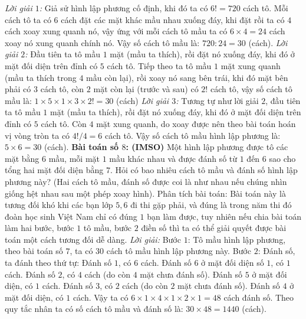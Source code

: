 \begin{multicols}{2}
	\vskip 0.1cm
	\textit{Lời giải $1$:}
	\vskip 0.1cm 
	Giả sử hình lập phương cố định, khi đó ta có $6!=720$ cách tô.
	\vskip 0.1cm
	Mỗi cách tô ta có $6$ cách đặt các mặt khác mầu nhau xuống đáy, khi đặt rồi ta có $4$ cách xoay xung quanh nó, vậy ứng với mỗi cách tô mầu ta có $6\times4=24$ cách xoay nó xung quanh chính nó. Vậy số cách tô mầu là: $720:24=30$ (cách).
	\vskip 0.1cm
	\textit{Lời giải $2$:}
	\vskip 0.1cm 
	Đầu tiên ta tô mầu $1$ mặt (mầu ta thích), rồi đặt nó xuống đáy, khi đó ở mặt đối diện trên đỉnh có $5$ cách tô.
	\vskip 0.1cm
	Tiếp theo ta tô mầu $1$ mặt xung quanh (mầu ta thích trong $4$ mầu còn lại), rồi xoay nó sang bên trái, khi đó mặt bên phải có $3$ cách tô, còn $2$ mặt còn lại (trước và sau) có $2!$ cách tô, vậy số cách tô mầu là: $1\times5\times1\times3\times2!=30$ (cách)
	\vskip 0.1cm
	\textit{Lời giải $3$:}
	\vskip 0.1cm
	Tương tự như lời giải $2$, đầu tiên ta tô mầu $1$ mặt (mầu ta thích), rồi đặt nó xuống đáy, khi đó ở mặt đối diện trên đỉnh có $5$ cách tô.
	\vskip 0.1cm
	Còn $4$ mặt xung quanh, do xoay được nên theo bài toán hoán vị vòng tròn ta có $4!/4=6$ cách tô.
	\vskip 0.1cm
	Vậy số cách tô mầu hình lập phương là: $5\times 6=30$ (cách).
	\vskip 0.1cm
	\textbf{\color{toancuabi}Bài toán số $8$: (IMSO)}
	\vskip 0.1cm
	Một hình lập phương được tô các mặt bằng $6$ mầu, mỗi mặt $1$ mầu khác nhau và được đánh số từ $1$ đến $6$ sao cho tổng hai mặt đối diện bằng $7$. Hỏi có bao nhiêu cách tô mầu và đánh số hình lập phương này? (Hai cách tô mầu, đánh số được coi là như nhau nếu chúng nhìn giống hệt nhau sau một phép xoay hình). 
	\vskip 0.1cm
	Phân tích bài toán: Bài toán này là tương đối khó khi các bạn lớp $5,6$ đi thi gặp phải, và đúng là trong năm thi đó đoàn học sinh Việt Nam chỉ có đúng $1$ bạn làm được, tuy nhiên nếu chia bài toán làm hai bước, bước $1$ tô mầu, bước $2$ điền số thì ta có thể giải quyết được bài toán một cách tương đối dễ dàng.
	\vskip 0.1cm
	\textit{Lời giải:}
	\vskip 0.1cm 
	Bước $1$: Tô mầu hình lập phương, theo bài toán số $7$, ta có $30$ cách tô mầu hình lập phương này.
	\vskip 0.1cm
	Bước $2$: Đánh số, ta đánh theo thứ tự:
	\vskip 0.1cm
	Đánh số $1$, có $6$ cách. Đánh số $6$ ở mặt đối diện số $1$, có $1$ cách.
	\vskip 0.1cm
	Đánh số $2$, có $4$ cách (do còn $4$ mặt chưa đánh số). Đánh số $5$ ở mặt đối diện, có $1$ cách.
	\vskip 0.1cm
	Đánh số $3$, có $2$ cách (do còn $2$ mặt chưa đánh số). Đánh số $4$ ở mặt đối diện, có $1$ cách.
	\vskip 0.1cm
	Vậy ta có $6\times1\times4\times1\times2\times1=48$ cách đánh số.
	\vskip 0.1cm
	Theo quy tắc nhân ta có số cách tô mầu và đánh số là: $30\times 48=1440$ (cách).

\end{multicols}
